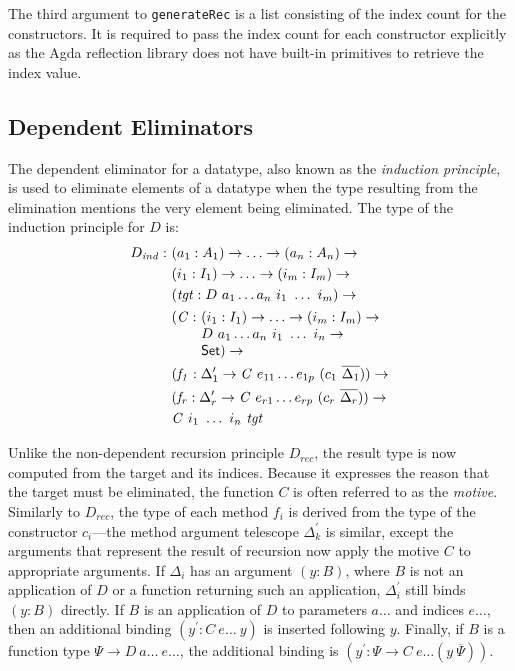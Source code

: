 \documentclass[sigplan,10pt]{acmart}
\begin{document}
The third argument to {\tt generateRec} is a list consisting of the index count
for the constructors. It is required to pass the index count for each constructor explicitly as the Agda reflection library does not have built-in primitives to retrieve the index value.

\subsection{Dependent Eliminators}
\label{sec:sec3.2}

The dependent eliminator for a datatype, also known as the \emph{induction principle}, is used to eliminate elements of a datatype when the type resulting from the elimination mentions the very element being eliminated. The type of the induction principle for $D$ is:
\begin{align*}
D_{\mathit{ind}} :\ & (a_1 : A_1) \to \ldots \to (a_n : A_n) \to\\
& (i_1 : I_1) \to \ldots \to (i_m : I_m) \to\\
& (\mathit{tgt} : D\ a_1 \ldots a_n\ i_1\ \ldots\ i_m) \to\\
& \begin{array}{@{}l@{}l}(\mathit{C} :\ & (i_1 : I_1) \to \ldots \to (i_m : I_m) \to\\  & D\ a_1 \ldots a_n\ i_1\ \ldots\ i_n \to\\ &\SET{})\to\end{array} \\
& (\mathit{f_1} : \Delta_1^\prime \to \mathit{C}\ e_{11} \ldots e_{1p}\ (c_1\ \overline{\Delta_1})) \to \\
& (\mathit{f_r} : \Delta_r^\prime \to \mathit{C}\ e_{r1} \ldots e_{rp}\ (c_r\ \overline{\Delta_r})) \to \\
& \mathit{C}\ i_1\ \ldots\ i_n\ \mathit{tgt}
\end{align*}

Unlike the non-dependent recursion principle $D_{\mathit{rec}}$, the result type is now computed from the target and its indices.
Because it expresses the reason that the target must be eliminated, the function $C$ is often referred to as the \emph{motive}.
Similarly to  $D_{\mathit{rec}}$, the type of each method $f_i$ is derived from the type of the constructor $c_i$---the method argument telescope $\Delta_k^\prime$ is similar, except the arguments that represent the result of recursion now apply the motive $C$ to appropriate arguments.
If $\Delta_i$ has an argument $(y : B)$, where $B$ is not an application of $D$ or a function returning such an application, $\Delta_i^\prime$ still binds $(y : B)$ directly.
If $B$ is an application of $D$ to parameters $a\ldots$ and indices $e\ldots$, then an additional binding $(y^\prime : C\ e\ldots\ y)$ is inserted following $y$.
Finally, if $B$ is a function type $\Psi \to D\ a\ldots\ e\ldots$, the additional binding is $(y^\prime : \Psi \to C\ e\ldots (y\ \overline{\Psi}))$. 
\end{document}
